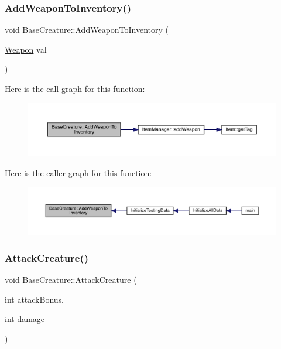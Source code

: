 \subsubsection{\texorpdfstring{Add\+Weapon\+To\+Inventory()}{AddWeaponToInventory()}}
{\footnotesize\ttfamily void Base\+Creature\+::\+Add\+Weapon\+To\+Inventory (\begin{DoxyParamCaption}\item[{\mbox{\hyperlink{class_weapon}{Weapon}}}]{val }\end{DoxyParamCaption})}

Here is the call graph for this function\+:
\nopagebreak
\begin{figure}[H]
\begin{center}
\leavevmode
\includegraphics[width=350pt]{d2/d3b/class_base_creature_ab0a90200835bc80c6db29e31f98d35e9_cgraph}
\end{center}
\end{figure}
Here is the caller graph for this function\+:
\nopagebreak
\begin{figure}[H]
\begin{center}
\leavevmode
\includegraphics[width=350pt]{d2/d3b/class_base_creature_ab0a90200835bc80c6db29e31f98d35e9_icgraph}
\end{center}
\end{figure}
\mbox{\label{class_base_creature_a63f43a7153eee3c1032b02f6d1948cdb}} 
\subsubsection{\texorpdfstring{Attack\+Creature()}{AttackCreature()}}
{\footnotesize\ttfamily void Base\+Creature\+::\+Attack\+Creature (\begin{DoxyParamCaption}\item[{int}]{attack\+Bonus,  }\item[{int}]{damage }\end{DoxyParamCaption})}

